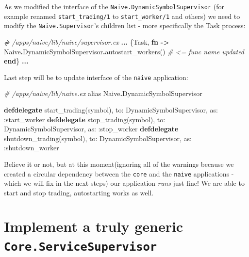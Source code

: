 \documentclass[
]{book}
\newenvironment{Shaded}{\begin{snugshade}}{\end{snugshade}}
\newcommand{\CommentTok}[1]{\textcolor[rgb]{0.56,0.35,0.01}{\textit{#1}}}
\newcommand{\ConstantTok}[1]{\textcolor[rgb]{0.00,0.00,0.00}{#1}}
\newcommand{\ImportTok}[1]{#1}
\newcommand{\KeywordTok}[1]{\textcolor[rgb]{0.13,0.29,0.53}{\textbf{#1}}}
\newcommand{\NormalTok}[1]{#1}
\newcommand{\OperatorTok}[1]{\textcolor[rgb]{0.81,0.36,0.00}{\textbf{#1}}}
\newcommand{\VariableTok}[1]{\textcolor[rgb]{0.00,0.00,0.00}{#1}}
\begin{document}
As we modified the interface of the \texttt{Naive.DynamicSymbolSupervisor} (for example renamed \texttt{start\_trading/1} to \texttt{start\_worker/1} and others) we need to modify the \texttt{Naive.Supervisor}'s children list - more specifically the Task process:

\begin{Shaded}
\begin{Highlighting}[]
\CommentTok{\# /apps/naive/lib/naive/supervisor.ex}
      \OperatorTok{...}
\NormalTok{      \{}\ConstantTok{Task}\NormalTok{,}
       \KeywordTok{fn} \OperatorTok{{-}\textgreater{}}
         \ConstantTok{Naive}\OperatorTok{.}\ConstantTok{DynamicSymbolSupervisor}\OperatorTok{.}\NormalTok{autostart\_workers() }\CommentTok{\# \textless{}= func name updated}
       \KeywordTok{end}\NormalTok{\}}
       \OperatorTok{...}
\end{Highlighting}
\end{Shaded}

Last step will be to update interface of the \texttt{naive} application:

\begin{Shaded}
\begin{Highlighting}[]
\CommentTok{\# /apps/naive/lib/naive.ex}
  \ImportTok{alias} \ConstantTok{Naive}\OperatorTok{.}\ConstantTok{DynamicSymbolSupervisor}

  \KeywordTok{defdelegate}\NormalTok{ start\_trading(symbol), }\VariableTok{to:} \ConstantTok{DynamicSymbolSupervisor}\NormalTok{, }\VariableTok{as:} \VariableTok{:start\_worker}
  \KeywordTok{defdelegate}\NormalTok{ stop\_trading(symbol), }\VariableTok{to:} \ConstantTok{DynamicSymbolSupervisor}\NormalTok{, }\VariableTok{as:} \VariableTok{:stop\_worker}
  \KeywordTok{defdelegate}\NormalTok{ shutdown\_trading(symbol), }\VariableTok{to:} \ConstantTok{DynamicSymbolSupervisor}\NormalTok{, }\VariableTok{as:} \VariableTok{:shutdown\_worker}
\end{Highlighting}
\end{Shaded}

Believe it or not, but at this moment(ignoring all of the warnings because we created a circular dependency between the \texttt{core} and the \texttt{naive} applications - which we will fix in the next steps) our application \emph{runs} just fine! We are able to start and stop trading, autostarting works as well.

\hypertarget{implement-a-truly-generic-core.servicesupervisor}{%
\section{\texorpdfstring{Implement a truly generic \texttt{Core.ServiceSupervisor}}{Implement a truly generic Core.ServiceSupervisor}}\label{implement-a-truly-generic-core.servicesupervisor}}
\end{document}
